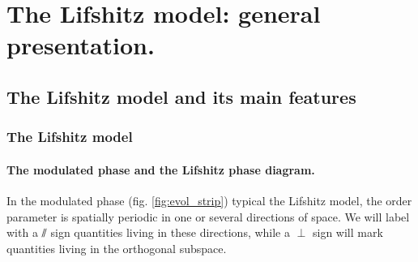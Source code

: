 
\chapter{The Lifshitz model: general presentation.}

\section{The Lifshitz model and its main features}

\subsection{The Lifshitz model}

\subsubsection{The modulated phase and the Lifshitz phase diagram.}


In the modulated phase (fig. \eqref{fig:evol_strip}) typical the Lifshitz model, the order parameter is spatially periodic in one or several directions of space. We will label with a $\sslash$ sign quantities living in these directions, while a $\perp$ sign will mark quantities living in the orthogonal subspace.

